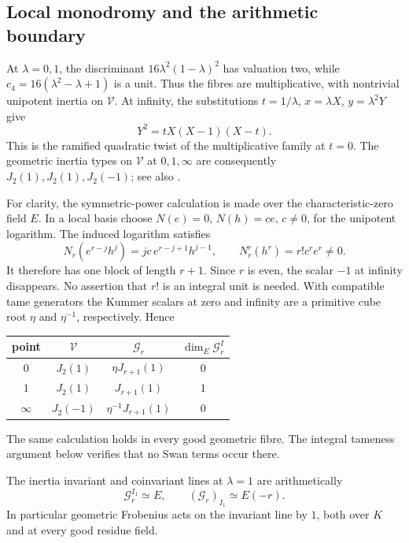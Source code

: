 \subsection{Local monodromy and the arithmetic boundary}

At \(\lambda=0,1\), the discriminant
\(16\lambda^2(1-\lambda)^2\) has valuation two, while
\(c_4=16(\lambda^2-\lambda+1)\) is a unit. Thus the fibres are
multiplicative, with nontrivial unipotent inertia on \(\mathcal V\).
At infinity, the substitutions \(t=1/\lambda\), \(x=\lambda X\),
\(y=\lambda^2Y\) give
\[
 Y^2=tX(X-1)(X-t).
\]
This is the ramified quadratic twist of the multiplicative family at
\(t=0\). The geometric inertia types on \(\mathcal V\) at
\(0,1,\infty\) are consequently \(J_2(1),J_2(1),J_2(-1)\);
see also \cite[Chapter~15]{Katz}.

For clarity, the symmetric-power calculation is made over the
characteristic-zero field \(E\). In a local basis choose
\(N(e)=0\), \(N(h)=ce\), \(c\ne0\), for the unipotent logarithm.
The induced logarithm satisfies
\[
 N_r(e^{r-j}h^j)=jc\,e^{r-j+1}h^{j-1},\qquad
 N_r^r(h^r)=r!c^re^r\ne0.
\]
It therefore has one block of length \(r+1\). Since \(r\) is even,
the scalar \(-1\) at infinity disappears. No assertion that \(r!\)
is an integral unit is needed. With compatible tame generators the
Kummer scalars at zero and infinity are a primitive cube root \(\eta\)
and \(\eta^{-1}\), respectively. Hence
\begin{center}
\begin{tabular}{c|c|c|c}
 point & \(\mathcal V\) & \(\mathcal G_r\) &
          \(\dim_E\mathcal G_r^{I}\)\\ \hline
 \(0\) & \(J_2(1)\) & \(\eta J_{r+1}(1)\) & \(0\)\\
 \(1\) & \(J_2(1)\) & \(J_{r+1}(1)\) & \(1\)\\
 \(\infty\) & \(J_2(-1)\) & \(\eta^{-1}J_{r+1}(1)\) & \(0\)
\end{tabular}
\end{center}
The same calculation holds in every good geometric fibre. The integral
tameness argument below verifies that no Swan terms occur there.

\begin{lemma}\label{lem:arithmetic-boundary}
The inertia invariant and coinvariant lines at \(\lambda=1\) are
arithmetically
\[
 \mathcal G_r^{I_1}\simeq E,
 \qquad (\mathcal G_r)_{I_1}\simeq E(-r).
\]
In particular geometric Frobenius acts on the invariant line by \(1\),
both over \(K\) and at every good residue field.
\end{lemma}

